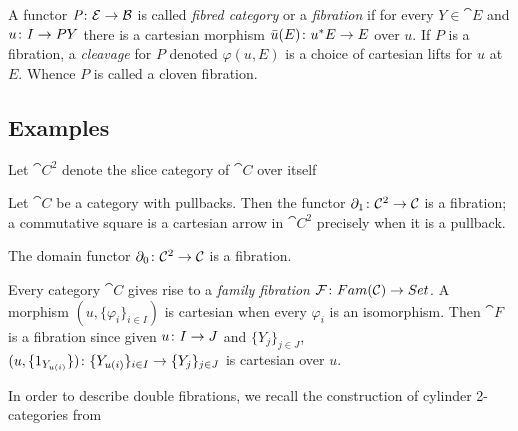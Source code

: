 \documentclass[9pt, leqno]{amsart}
\begin{document}
\begin{defn}
	A functor $\operatorname{\textit{P} \colon \mathcal{E} \rightarrow \mathcal{B}}$ is called \emph{fibred category} or a \emph{fibration} if for every $Y \in \cat{E}$ and $u \colon I \rightarrow PY$ there is a cartesian morphism $\bar{u}(E) \colon u ^\ast E \rightarrow E$ over $u$. If $P$ is a fibration, a \emph{cleavage} for $P$ denoted $\varphi(u,E)$ is a choice of cartesian lifts for $u$ at $E$. Whence $P$ is called a cloven fibration.
\end{defn}

\subsection{Examples}

Let $\cat{C}^2$ denote the slice category of $\cat{C}$ over itself
\begin{example}
	Let $\cat{C}$ be a category with pullbacks. Then the functor $\partial_1 \colon \mathcal{C}^2 \rightarrow \mathcal{C}$ is a fibration; a commutative square is a cartesian arrow in $\cat{C}^2$ precisely when it is a pullback.
\end{example}

\begin{example}
	The domain functor $\partial_0 \colon \mathcal{\mathcal{C}}^2 \rightarrow \mathcal{C}$ is a fibration.
\end{example}

\begin{example}
	Every category $\cat{C}$ gives rise to a \emph{family fibration} $\mathcal{F} \colon Fam(\mathcal{C}) \rightarrow Set$. A morphism $(u,\{\varphi_i\}_{i \in I})$ is cartesian when every $\varphi_i$ is an isomorphism. Then $\cat{F}$ is a fibration since given $u \colon I \rightarrow J$ and $\{Y_j\}_{j \in J}$, $(u,\{1_{Y_{u(i)}}\}) \colon \{Y_{u(i)}\}_{i \in I} \rightarrow \{Y_j\}_{j \in J}$ is cartesian over $u$. 
\end{example}

In order to describe double fibrations, we recall the construction of cylinder 2-categories from \cite{JBbica,Crutt}
\end{document}
